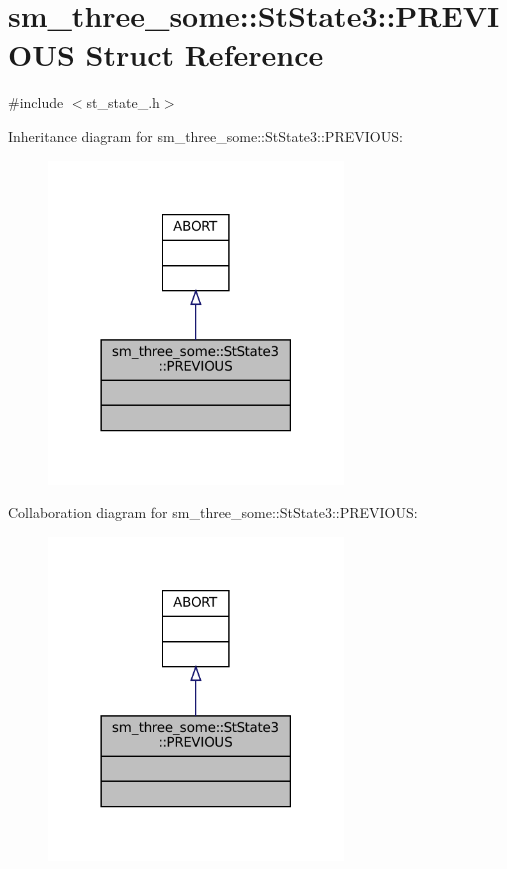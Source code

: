 \hypertarget{structsm__three__some_1_1StState3_1_1PREVIOUS}{}\section{sm\+\_\+three\+\_\+some\+:\+:St\+State3\+:\+:P\+R\+E\+V\+I\+O\+US Struct Reference}
\label{structsm__three__some_1_1StState3_1_1PREVIOUS}


{\ttfamily \#include $<$st\+\_\+state\+\_.\+h$>$}



Inheritance diagram for sm\+\_\+three\+\_\+some\+:\+:St\+State3\+:\+:P\+R\+E\+V\+I\+O\+US\+:
\nopagebreak
\begin{figure}[H]
\begin{center}
\leavevmode
\includegraphics[width=222pt]{structsm__three__some_1_1StState3_1_1PREVIOUS__inherit__graph}
\end{center}
\end{figure}


Collaboration diagram for sm\+\_\+three\+\_\+some\+:\+:St\+State3\+:\+:P\+R\+E\+V\+I\+O\+US\+:
\nopagebreak
\begin{figure}[H]
\begin{center}
\leavevmode
\includegraphics[width=222pt]{structsm__three__some_1_1StState3_1_1PREVIOUS__coll__graph}
\end{center}
\end{figure}


